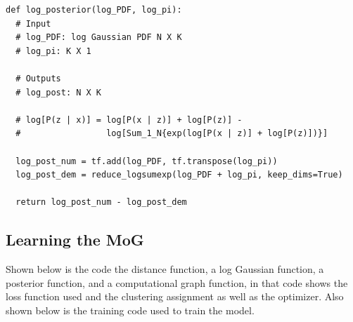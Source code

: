\documentclass[12pt]{article}
\begin{document}
\begin{verbatim}
def log_posterior(log_PDF, log_pi):
  # Input
  # log_PDF: log Gaussian PDF N X K
  # log_pi: K X 1

  # Outputs
  # log_post: N X K

  # log[P(z | x)] = log[P(x | z)] + log[P(z)] - 
  #                 log[Sum_1_N{exp(log[P(x | z)] + log[P(z)])}] 

  log_post_num = tf.add(log_PDF, tf.transpose(log_pi)) 
  log_post_dem = reduce_logsumexp(log_PDF + log_pi, keep_dims=True)

  return log_post_num - log_post_dem
\end{verbatim}

\subsection{Learning the MoG} 
Shown below is the code the distance function, a log Gaussian function, a posterior function, 
and a computational graph function, in that code shows
the loss function used and the clustering assignment as well as the optimizer. 
Also shown below is the training code used to train the model.
\end{document}
